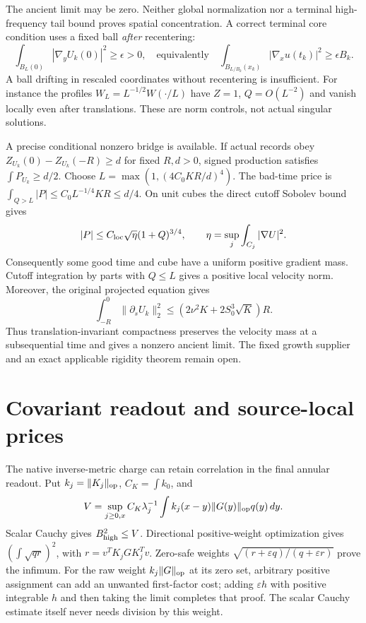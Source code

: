 \documentclass[11pt]{article}
\begin{document}
The ancient limit may be zero. Neither global normalization nor a terminal
high-frequency tail bound proves spatial concentration. A correct terminal
core condition uses a fixed ball \emph{after} recentering:
\[
 \int_{B_L(0)}|\nabla_yU_k(0)|^2\ge\epsilon>0,
 \quad\text{equivalently}\quad
 \int_{B_{L/B_k}(x_k)}|\nabla_xu(t_k)|^2\ge\epsilon B_k.
\]
A ball drifting in rescaled coordinates without recentering is insufficient.
For instance the profiles $W_L=L^{-1/2}W(\cdot/L)$ have $Z=1$, $Q=O(L^{-2})$
and vanish locally even after translations. These are norm controls,
not actual singular solutions.

A precise conditional nonzero bridge is available. If actual records obey
$Z_{U_k}(0)-Z_{U_k}(-R)\ge d$ for fixed $R,d>0$, signed production satisfies
$\int P_{U_k}\ge d/2$. Choose
$L=\max(1,(4C_0KR/d)^4)$. The bad-time price is
$\int_{Q>L}|P|\le C_0L^{-1/4}KR\le d/4$.
On unit cubes the direct cutoff Sobolev bound gives
\[
 |P|\le C_{\rm loc}\sqrt{\eta}(1+Q)^{3/4},\qquad
 \eta=\sup_j\int_{C_j}|\nabla U|^2.
\]
Consequently some good time and cube have a uniform positive gradient mass.
Cutoff integration by parts with $Q\le L$ gives a positive local velocity
norm. Moreover, the original projected equation gives
\[
 \int_{-R}^0\|\partial_sU_k\|_2^2\le
 (2\nu^2K+2S_0^3\sqrt K)R.
\]
Thus translation-invariant compactness preserves the velocity mass at a
subsequential time and gives a nonzero ancient limit. The fixed growth
supplier and an exact applicable rigidity theorem remain open.

\section{Covariant readout and source-local prices}

The native inverse-metric charge can retain correlation in the final
annular readout. Put $k_j=\|K_j\|_{\rm op}$, $C_K=\int k_0$, and
\[
 V=\sup_{j\ge0,x}C_K\lambda_j^{-1}
       \int k_j(x-y)\|G(y)\|_{\rm op}q(y)\,dy.
\]
Scalar Cauchy gives $B_{\rm high}^2\le V$.
Directional positive-weight optimization gives $(\int\sqrt{qr})^2$,
with $r=v^TK_jGK_j^Tv$. Zero-safe weights
$\sqrt{(r+\varepsilon q)/(q+\varepsilon r)}$ prove the infimum.
For the raw weight $k_j\|G\|_{\rm op}$ at its zero set, arbitrary positive
assignment can add an unwanted first-factor cost; adding $\varepsilon h$
with positive integrable $h$ and then taking the limit completes that proof.
The scalar Cauchy estimate itself never needs division by this weight.
\end{document}
